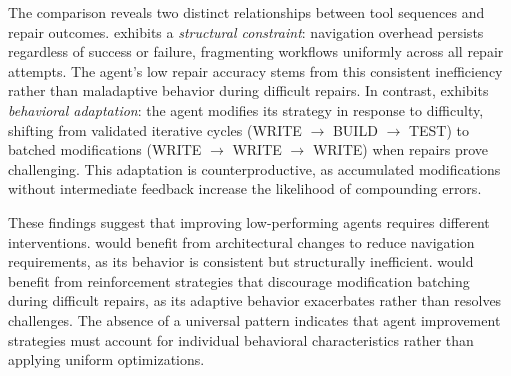 The comparison reveals two distinct relationships between tool sequences and repair outcomes. \qwencode exhibits a \textit{structural constraint}: navigation overhead persists regardless of success or failure, fragmenting workflows uniformly across all repair attempts. The agent's low repair accuracy stems from this consistent inefficiency rather than maladaptive behavior during difficult repairs. In contrast, \geminicli exhibits \textit{behavioral adaptation}: the agent modifies its strategy in response to difficulty, shifting from validated iterative cycles (WRITE $\rightarrow$ BUILD $\rightarrow$ TEST) to batched modifications (WRITE $\rightarrow$ WRITE $\rightarrow$ WRITE) when repairs prove challenging. This adaptation is counterproductive, as accumulated modifications without intermediate feedback increase the likelihood of compounding errors.

These findings suggest that improving low-performing agents requires different interventions. \qwencode would benefit from architectural changes to reduce navigation requirements, as its behavior is consistent but structurally inefficient. \geminicli would benefit from reinforcement strategies that discourage modification batching during difficult repairs, as its adaptive behavior exacerbates rather than resolves challenges. The absence of a universal pattern indicates that agent improvement strategies must account for individual behavioral characteristics rather than applying uniform optimizations.
